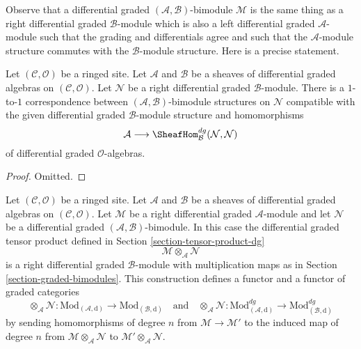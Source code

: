 \medskip\noindent
Observe that a differential graded $(\mathcal{A}, \mathcal{B})$-bimodule
$\mathcal{M}$ is the same thing as a right differential graded
$\mathcal{B}$-module which is also a left differential graded
$\mathcal{A}$-module such that the grading and differentials agree
and such that the $\mathcal{A}$-module structure commutes with
the $\mathcal{B}$-module structure. Here is a precise statement.

\begin{lemma}
\label{lemma-what-makes-a-bimodule-dg}
Let $(\mathcal{C}, \mathcal{O})$ be a ringed site. Let $\mathcal{A}$
and $\mathcal{B}$ be a sheaves of differential graded algebras on
$(\mathcal{C}, \mathcal{O})$. Let $\mathcal{N}$ be a right differential
graded $\mathcal{B}$-module. There is a $1$-to-$1$ correspondence
between $(\mathcal{A}, \mathcal{B})$-bimodule structures on
$\mathcal{N}$ compatible with the given
differential graded $\mathcal{B}$-module structure and homomorphisms
$$
\mathcal{A}
\longrightarrow
\SheafHom^{dg}_\mathcal{B}(\mathcal{N}, \mathcal{N})
$$
of differential graded $\mathcal{O}$-algebras.
\end{lemma}

\begin{proof}
Omitted.
\end{proof}

\noindent
Let $(\mathcal{C}, \mathcal{O})$ be a ringed site. Let $\mathcal{A}$
and $\mathcal{B}$ be a sheaves of differential graded algebras on
$(\mathcal{C}, \mathcal{O})$. Let $\mathcal{M}$ be a right
differential graded $\mathcal{A}$-module and let $\mathcal{N}$ be a
differential graded $(\mathcal{A}, \mathcal{B})$-bimodule. In this case the
differential graded tensor product defined in
Section \ref{section-tensor-product-dg}
$$
\mathcal{M} \otimes_\mathcal{A} \mathcal{N}
$$
is a right differential graded $\mathcal{B}$-module with
multiplication maps as in Section \ref{section-graded-bimodules}.
This construction defines a functor and a functor of graded categories
$$
\otimes_\mathcal{A} \mathcal{N} :
\text{Mod}_{(\mathcal{A}, \text{d})}
\longrightarrow
\text{Mod}_{(\mathcal{B}, \text{d})}
\quad\text{and}\quad
\otimes_\mathcal{A} \mathcal{N} :
\text{Mod}^{dg}_{(\mathcal{A}, \text{d})}
\longrightarrow
\text{Mod}^{dg}_{(\mathcal{B}, \text{d})}
$$
by sending homomorphisms of degree $n$ from $\mathcal{M} \to \mathcal{M}'$
to the induced map of degree $n$ from
$\mathcal{M} \otimes_\mathcal{A} \mathcal{N}$ to
$\mathcal{M}' \otimes_\mathcal{A} \mathcal{N}$.

